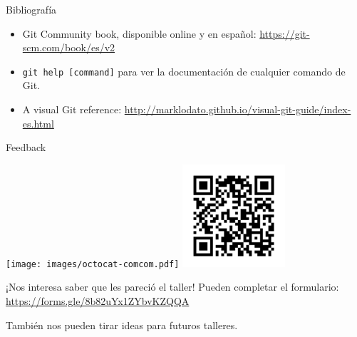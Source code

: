 \begin{frame}[t]{Bibliografía}

    \begin{itemize}
        \item Git Community book, disponible online y en español: \url{https://git-scm.com/book/es/v2}
        \item \texttt{git help [command]} para ver la documentación de cualquier comando de Git.
        \item A visual Git reference: \url{http://marklodato.github.io/visual-git-guide/index-es.html}
    \end{itemize}

\end{frame}

\begin{frame}{Feedback}

    \begin{center}
        \texttt{[image: images/octocat-comcom.pdf]}
        \includegraphics[height=1.5in]{images/feedback-form-qr.png}
    \end{center}

    \begin{block}{¡Nos interesa saber que les pareció el taller!}
        Pueden completar el formulario: \url{https://forms.gle/8b82uYx1ZYbvKZQQA}

        \vspace{0.5em}

        También nos pueden tirar ideas para futuros talleres.
    \end{block}

\end{frame}
